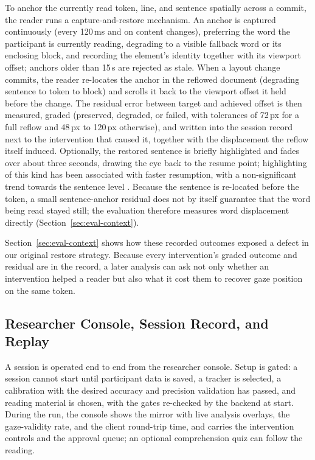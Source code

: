 To anchor the currently read token, line, and sentence spatially across a commit, the reader runs a capture-and-restore mechanism.
An anchor is captured continuously (every 120\,ms and on content changes), preferring the word the participant is currently reading, degrading to a visible fallback word or its enclosing block, and recording the element's identity together with its viewport offset; anchors older than 15\,s are rejected as stale.
When a layout change commits, the reader re-locates the anchor in the reflowed document (degrading sentence to token to block) and scrolls it back to the viewport offset it held before the change.
The residual error between target and achieved offset is then measured, graded (preserved, degraded, or failed, with tolerances of 72\,px for a full reflow and 48\,px to 120\,px otherwise), and written into the session record next to the intervention that caused it, together with the displacement the reflow itself induced.
Optionally, the restored sentence is briefly highlighted and fades over about three seconds, drawing the eye back to the resume point; highlighting of this kind has been associated with faster resumption, with a non-significant trend towards the sentence level \cite{jensen2025context}.
Because the sentence is re-located before the token, a small sentence-anchor residual does not by itself guarantee that the word being read stayed still; the evaluation therefore measures word displacement directly (Section~\ref{sec:eval-context}).

Section~\ref{sec:eval-context} shows how these recorded outcomes exposed a defect in our original restore strategy.
Because every intervention's graded outcome and residual are in the record, a later analysis can ask not only whether an intervention helped a reader but also what it cost them to recover gaze position on the same token.

\subsection{Researcher Console, Session Record, and Replay}
\label{sec:platform-record}

A session is operated end to end from the researcher console.
Setup is gated: a session cannot start until participant data is saved, a tracker is selected, a calibration with the desired accuracy and precision validation has passed, and reading material is chosen, with the gates re-checked by the backend at start.
During the run, the console shows the mirror with live analysis overlays, the gaze-validity rate, and the client round-trip time, and carries the intervention controls and the approval queue; an optional comprehension quiz can follow the reading.

